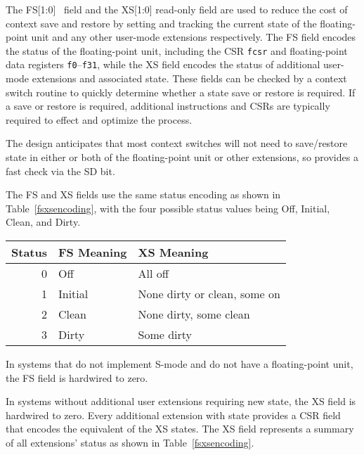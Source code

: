 The FS[1:0] \warl\ field and the XS[1:0] read-only field are used
to reduce the cost of context save and restore by setting and tracking
the current state of the floating-point unit and any other user-mode
extensions respectively.  The FS field encodes the status of the
floating-point unit, including the CSR {\tt fcsr} and floating-point
data registers {\tt f0}--{\tt f31}, while the XS field encodes the
status of additional user-mode extensions and associated state.
These fields can be checked by a context switch routine to quickly
determine whether a state save or restore is required.  If a save or
restore is required, additional instructions and CSRs are typically
required to effect and optimize the process.

\begin{commentary}
  The design anticipates that most context switches will not need to
  save/restore state in either or both of the floating-point unit or
  other extensions, so provides a fast check via the SD bit.
\end{commentary}

The FS and XS fields use the same status encoding as shown in
Table~\ref{fsxsencoding}, with the four possible status values being
Off, Initial, Clean, and Dirty.

\begin{table*}[h!]
\begin{center}
\begin{tabular}{|r|l|l|}
\hline
Status  & FS Meaning & XS Meaning\\
\hline	 
0 & Off     &  All off \\
1 & Initial &  None dirty or clean, some on\\
2 & Clean   &  None dirty, some clean \\
3 & Dirty   &  Some dirty \\
\hline
\end{tabular}
\end{center}
\caption{Encoding of FS[1:0] and XS[1:0] status fields.}
\label{fsxsencoding}
\end{table*}

In systems that do not implement S-mode and do not have a
floating-point unit, the FS field is hardwired to zero.

In systems without additional user extensions requiring new state, the
XS field is hardwired to zero.  Every additional extension with state
provides a CSR field that encodes the equivalent of the XS states.
The XS field represents a summary of all
extensions' status as shown in Table~\ref{fsxsencoding}.

